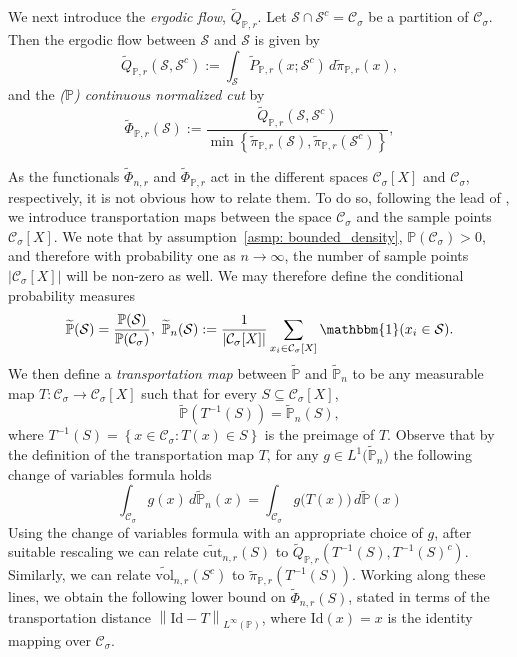 \documentclass[11pt,twoside]{article}
\theoremstyle{definition}
\newcommand{\set}[1]{\left\{#1\right\}}
\newcommand{\vol}{\mathrm{vol}}
\newcommand{\cut}{\mathrm{cut}}
\newcommand{\abs}[1]{\left \lvert #1 \right \rvert}
\newcommand{\norm}[1]{\left\lVert#1\right\rVert}
\newcommand{\1}{\mathbbm{1}}
\newcommand{\Xbf}{X}
\newcommand{\Pbb}{\mathbb{P}}
\newcommand{\Sset}{\mathcal{S}}
\newcommand{\Cset}{\mathcal{C}}
\newcommand{\Csig}{\Cset_{\sigma}}
\newcommand{\piwt}{\widetilde{\pi}}
\begin{document}
We next introduce the \emph{ergodic flow}, $\widetilde{Q}_{\Pbb,r}$. Let $\Sset \cap \Sset^c = \Csig$ be a partition of $\Csig$. Then the ergodic flow between $\Sset$ and $\Sset$ is given by 
\begin{equation*}
\widetilde{Q}_{\Pbb,r}(\Sset, \Sset^c) := \int_{\Sset} \widetilde{P}_{\Pbb,r}(x; \Sset^c) \,d\piwt_{\Pbb,r}(x), 
\end{equation*}
and the \emph{($\Pbb$) continuous normalized cut} by
\begin{equation*}
\widetilde{\Phi}_{\Pbb,r}(\Sset) := \frac{\widetilde{Q}_{\Pbb,r}(\Sset, \Sset^c)}{\min \set{\piwt_{\Pbb,r}(\Sset),\piwt_{\Pbb,r}(\Sset^c)}},
\end{equation*}

As the functionals $\widetilde{\Phi}_{n,r}$ and $\widetilde{\Phi}_{\Pbb,r}$ act in the different spaces $\Csig[\Xbf]$ and $\Csig$, respectively, it is not obvious how to relate them. To do so, following the lead of \cite{garciatrillos16}, we introduce transportation maps between the space $\Csig$ and the sample points $\Csig[\Xbf]$. We note that by assumption~\ref{asmp: bounded_density}, $\Pbb(\Csig) > 0$, and therefore with probability one as $n \to \infty$, the number of sample points $\abs{\Csig[\Xbf]}$ will be non-zero as well. We may therefore define the conditional probability measures
\begin{equation*}
\widetilde{\Pbb}(\Sset) = \frac{\Pbb(\Sset)}{\Pbb(\Csig)}, ~ \widetilde{\Pbb}_{n}(\Sset) := \frac{1}{\abs{\Csig[\Xbf]}} \sum_{x_i \in \Csig[\Xbf]} \1(x_i \in \Sset).
\end{equation*} 
We then define a \emph{transportation map} between $\widetilde{\Pbb}$ and $\widetilde{\Pbb}_n$ to be any measurable map $T: \Csig \to \Csig[\Xbf]$ such that for every $S \subseteq \Csig[\Xbf]$,
\begin{equation*}
\widetilde{\Pbb}(T^{-1}(S)) = \widetilde{\Pbb}_n(S),
\end{equation*}
where $T^{-1}(S) = \set{x \in \Csig: T(x) \in S}$ is the preimage of $T$. Observe that by the definition of the transportation map $T$, for any $g \in L^1\bigl(\widetilde{\Pbb}_n\bigr)$ the following change of variables formula holds
\begin{equation*}
\int_{\Csig} g(x) \,d\widetilde{\Pbb}_{n}(x) = \int_{\Csig} g\bigl(T(x)\bigr) \,d\widetilde{\Pbb}(x)
\end{equation*}
Using the change of variables formula with an appropriate choice of $g$, after suitable rescaling we can relate $\widetilde{\cut}_{n,r}(S)$ to $\widetilde{Q}_{\Pbb,r}(T^{-1}(S), T^{-1}(S)^c)$. Similarly, we can relate $\widetilde{\vol}_{n,r}(S^c)$ to $\widetilde{\pi}_{\Pbb,r}(T^{-1}(S))$. Working along these lines, we obtain the following lower bound on $\widetilde{\Phi}_{n,r}(S)$, stated in terms of the transportation distance $\norm{\mathrm{Id} - T}_{L^{\infty}(\Pbb)}$, where $\mathrm{Id}(x) = x$ is the identity mapping over $\Csig$.
\end{document}
